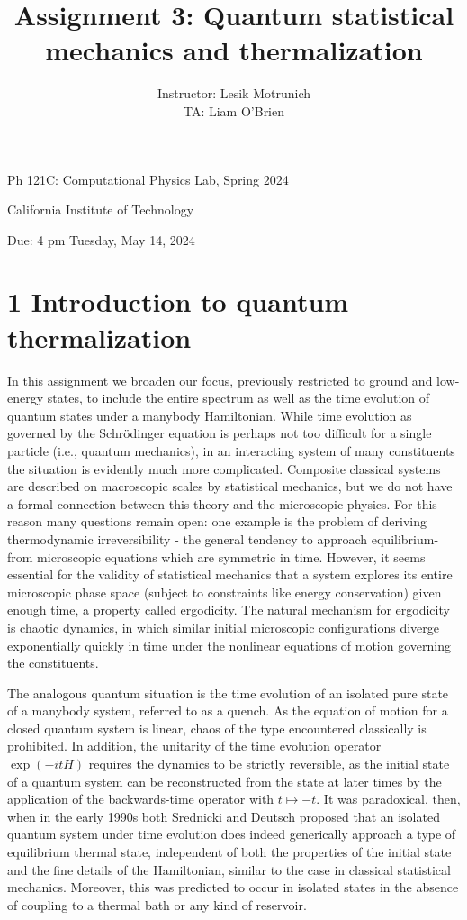 \documentclass[12pt]{article}
\title{Assignment 3: Quantum statistical mechanics and thermalization }
\author{Instructor: Lesik Motrunich\\
TA: Liam O'Brien}
\date{}
\begin{document}
\maketitle
Ph 121C: Computational Physics Lab, Spring 2024

California Institute of Technology

Due: 4 pm Tuesday, May 14, 2024

\section*{1 Introduction to quantum thermalization}
In this assignment we broaden our focus, previously restricted to ground and low-energy states, to include the entire spectrum as well as the time evolution of quantum states under a manybody Hamiltonian. While time evolution as governed by the Schrödinger equation is perhaps not too difficult for a single particle (i.e., quantum mechanics), in an interacting system of many constituents the situation is evidently much more complicated. Composite classical systems are described on macroscopic scales by statistical mechanics, but we do not have a formal connection between this theory and the microscopic physics. For this reason many questions remain open: one example is the problem of deriving thermodynamic irreversibility - the general tendency to approach equilibrium-from microscopic equations which are symmetric in time. However, it seems essential for the validity of statistical mechanics that a system explores its entire microscopic phase space (subject to constraints like energy conservation) given enough time, a property called ergodicity. The natural mechanism for ergodicity is chaotic dynamics, in which similar initial microscopic configurations diverge exponentially quickly in time under the nonlinear equations of motion governing the constituents.

The analogous quantum situation is the time evolution of an isolated pure state of a manybody system, referred to as a quench. As the equation of motion for a closed quantum system is linear, chaos of the type encountered classically is prohibited. In addition, the unitarity of the time evolution operator $\exp (-i t H)$ requires the dynamics to be strictly reversible, as the initial state of a quantum system can be reconstructed from the state at later times by the application of the backwards-time operator with $t \mapsto-t$. It was paradoxical, then, when in the early 1990s both Srednicki and Deutsch proposed that an isolated quantum system under time evolution does indeed generically approach a type of equilibrium thermal state, independent of both the properties of the initial state and the fine details of the Hamiltonian, similar to the case in classical statistical mechanics. Moreover, this was predicted to occur in isolated states in the absence of coupling to a thermal bath or any kind of reservoir.
\end{document}
